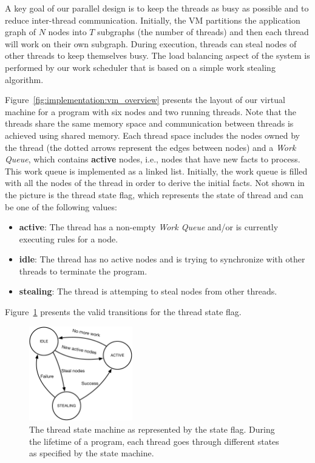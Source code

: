 A key goal of our parallel design is to keep the threads as busy as possible and
to reduce inter-thread communication. Initially, the VM partitions the
application graph of $N$ nodes into $T$ subgraphs (the number of threads) and
then each thread will work on their own subgraph. During execution, threads can
steal nodes of other threads to keep themselves busy. The load balancing aspect
of the system is performed by our work scheduler that is based on a simple work
stealing algorithm.

Figure~\ref{fig:implementation:vm_overview} presents the layout of our virtual
machine for a program with six nodes and two running threads. Note that the
threads share the same memory space and communication between threads is
achieved using shared memory. Each thread space includes the nodes owned by the
thread (the dotted arrows represent the edges between nodes) and a \emph{Work
Queue}, which contains \textbf{active} nodes, i.e., nodes that have new facts to
process. This work queue is implemented as a linked list.  Initially, the work
queue is filled with all the nodes of the thread in order to derive the initial
facts. Not shown in the picture is the thread state flag, which represents the
state of thread and can be one of the following values:

\begin{itemize}

   \item \textbf{active}: The thread has a non-empty \emph{Work Queue} and/or is
      currently executing rules for a node.

   \item \textbf{idle}: The thread has no active nodes and is trying to
      synchronize with other threads to terminate the program.
   
   \item \textbf{stealing}: The thread is attemping to steal nodes from other
      threads.
\end{itemize}

Figure~\ref{fig:implementation:thread_states} presents the valid transitions for
the thread state flag.

\begin{figure}[ht]
   \centering
   \includegraphics[width=0.4\textwidth]{figures/implementation/thread_states.pdf}
   \caption{The thread state machine as represented by the state flag. During
      the lifetime of a program, each thread goes through different states as
      specified by the state machine.}
   \label{fig:implementation:thread_states}
\end{figure}

